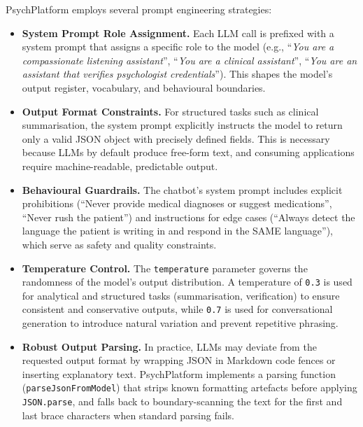 PsychPlatform employs several prompt engineering strategies:

\begin{itemize}[leftmargin=1.5em, itemsep=6pt]

  \item \textbf{System Prompt Role Assignment.} Each LLM call is prefixed with
        a system prompt that assigns a specific role to the model (e.g.,
        ``\textit{You are a compassionate listening assistant}'', ``\textit{You
        are a clinical assistant}'', ``\textit{You are an assistant that
        verifies psychologist credentials}''). This shapes the model's output
        register, vocabulary, and behavioural boundaries.

  \item \textbf{Output Format Constraints.} For structured tasks such as
        clinical summarisation, the system prompt explicitly instructs the model
        to return only a valid JSON object with precisely defined fields. This
        is necessary because LLMs by default produce free-form text, and
        consuming applications require machine-readable, predictable output.

  \item \textbf{Behavioural Guardrails.} The chatbot's system prompt includes
        explicit prohibitions (``Never provide medical diagnoses or suggest
        medications'', ``Never rush the patient'') and instructions for edge
        cases (``Always detect the language the patient is writing in and
        respond in the SAME language''), which serve as safety and quality
        constraints.

  \item \textbf{Temperature Control.} The \texttt{temperature} parameter
        governs the randomness of the model's output distribution. A
        temperature of \texttt{0.3} is used for analytical and structured tasks
        (summarisation, verification) to ensure consistent and conservative
        outputs, while \texttt{0.7} is used for conversational generation to
        introduce natural variation and prevent repetitive phrasing.

  \item \textbf{Robust Output Parsing.} In practice, LLMs may deviate from the
        requested output format by wrapping JSON in Markdown code fences or
        inserting explanatory text. PsychPlatform implements a parsing function
        (\texttt{parseJsonFromModel}) that strips known formatting artefacts
        before applying \texttt{JSON.parse}, and falls back to
        boundary-scanning the text for the first and last brace characters when
        standard parsing fails.

\end{itemize}

